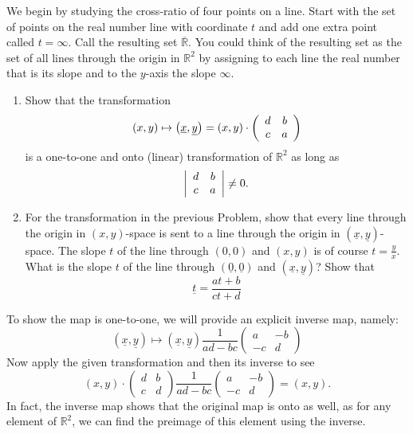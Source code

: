 \documentclass{ximera}
\begin{document}
We begin by studying the cross-ratio of four points on a line. Start
with the set of points on the real number line with coordinate $t$ and
add one extra point called $t=\infty$. Call the resulting set
$\overline{\mathbb{R}}$. You could think of the resulting set as the
set of all lines through the origin in $\mathbb{R}^{2}$ by assigning
to each line the real number that is its slope and to the $y$-axis the
slope $\infty$.

\begin{problem}\hfil
\begin{enumerate}
\item Show that the transformation%
\[
\left(  x,y\right)  \mapsto\left(  \underline{x},\underline{y}\right)
=\left(  x,y\right)  \cdot\left(
\begin{array}
[c]{cc}%
d & b\\
c & a
\end{array}
\right)
\]
is a one-to-one and onto (linear) transformation of $\mathbb{R}^{2}$ as long as
\begin{equation}
\left\vert
\begin{array}
[c]{cc}%
d & b\\
c & a
\end{array}
\right\vert \neq0. \label{52}%
\end{equation}

\item For the transformation in the previous Problem, show that every line through the origin in $\left( x,y\right) $-space is sent to a line
through the origin in $\left( \underline{x},\underline{y}\right)
$-space. The slope $t$ of the line through $\left( 0,0\right) $ and
$\left( x,y\right) $ is of course $t=\frac{y}{x}$. What is the
slope \underline{$t$} of the line through
$\left( \underline{0},\underline{0}\right) $ and $\left(
\underline{x},\underline{y}\right)  $? Show that%
\begin{equation}
\underline{t}=\frac{at+b}{ct+d} \label{41}%
\end{equation}
\end{enumerate}
\begin{freeResponse}
To show the map is one-to-one, we will provide an explicit inverse
map, namely:
\[
\left(  \underline{x},\underline{y}\right)\mapsto \left(  \underline{x},\underline{y}\right) 
\frac{1}{ad-bc}\begin{pmatrix}
a &-b \\
-c& d
\end{pmatrix}
\]
Now apply the given transformation and then its inverse to see
\[
(x,y) \cdot \begin{pmatrix}
d & b \\
c & d
\end{pmatrix}\frac{1}{ad-bc}\begin{pmatrix}
a &-b \\
-c& d
\end{pmatrix} = (x,y).
\]
In fact, the inverse map shows that the original map is onto as well,
 as for any element of $\mathbb{R}^2$, we can find the preimage of
 this element using the inverse.  


\end{freeResponse}
\end{problem}
\end{document}
